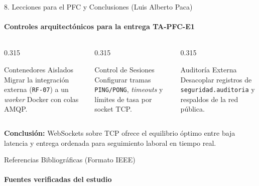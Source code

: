 \documentclass[aspectratio=169,10pt]{beamer}
\begin{document}
\begin{frame}{8. Lecciones para el PFC y Conclusiones (Luis Alberto Paca)}
  \framesubtitle{Controles arquitectónicos para la entrega TA-PFC-E1 \cite{ref4,petrescu2025iotprotocols}}
  \vspace{0.15cm}
  \begin{columns}[T,totalwidth=\textwidth]
    \begin{column}{0.315\textwidth}
      \begin{bluecard}{Contenedores Aislados}
        \footnotesize Migrar la integración externa (\texttt{RF-07}) a un \textit{worker} Docker con colas AMQP.
      \end{bluecard}
    \end{column}
    \begin{column}{0.315\textwidth}
      \begin{bluecard}{Control de Sesiones}
        \footnotesize Configurar tramas \texttt{PING/PONG}, \textit{timeouts} y límites de tasa por socket TCP.
      \end{bluecard}
    \end{column}
    \begin{column}{0.315\textwidth}
      \begin{ambercard}{Auditoría Externa}
        \footnotesize Desacoplar registros de \texttt{seguridad.auditoria} y respaldos de la red pública.
      \end{ambercard}
    \end{column}
  \end{columns}
  \vspace{0.45cm}
  \begin{demobar}
    \textcolor{AmberAccent}{\textbf{Conclusión:}} WebSockets sobre TCP ofrece el equilibrio óptimo entre baja latencia y entrega ordenada para seguimiento laboral en tiempo real.
  \end{demobar}
\end{frame}

\begin{frame}[allowframebreaks]{Referencias Bibliográficas (Formato IEEE)}
  \framesubtitle{Fuentes verificadas del estudio}
  \renewcommand*{\bibfont}{\scriptsize}
  \printbibliography[heading=none]
\end{frame}
\end{document}
